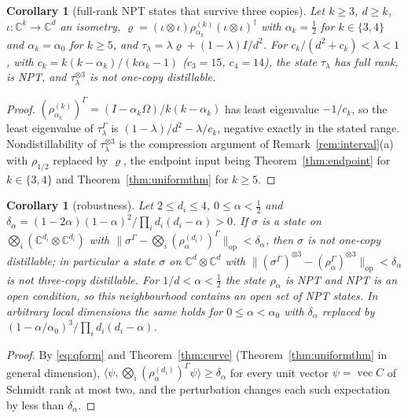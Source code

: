 \documentclass[aps,pra,twocolumn,superscriptaddress,nofootinbib,longbibliography]{revtex4-2}
\newcommand{\C}{\mathbb C}
\newcommand{\Om}{\Omega}
\DeclareMathOperator{\vecop}{vec}
\theoremstyle{plain}
\newtheorem{corollary}[theorem]{Corollary}
\theoremstyle{definition}
\theoremstyle{remark}
\begin{document}
\begin{corollary}[full-rank NPT states that survive three copies]\label{cor:noise}
Let $k\ge3$, $d\ge k$, $\iota:\C^k\to\C^d$ an isometry, $\varrho=(\iota\otimes\iota)\rho^{(k)}_{\alpha_k}(\iota\otimes\iota)^\dagger$ with $\alpha_k=\tfrac12$ for $k\in\{3,4\}$ and $\alpha_k=\alpha_0$ for $k\ge5$, and $\tau_\lambda=\lambda\varrho+(1-\lambda)I/d^2$. For $c_k/(d^2+c_k)<\lambda<1$, with $c_k=k(k-\alpha_k)/(k\alpha_k-1)$ ($c_3=15$, $c_4=14$), the state $\tau_\lambda$ has full rank, is NPT, and $\tau_\lambda^{\otimes3}$ is not one-copy distillable.
\end{corollary}
\begin{proof}
$(\rho^{(k)}_{\alpha_k})^\Gamma=(I-\alpha_k\Om)/k(k-\alpha_k)$ has least eigenvalue $-1/c_k$, so the least eigenvalue of $\tau_\lambda^\Gamma$ is $(1-\lambda)/d^2-\lambda/c_k$, negative exactly in the stated range. Nondistillability of $\tau_\lambda^{\otimes3}$ is the compression argument of Remark~\ref{rem:interval}(a) with $\rho_{1/2}$ replaced by $\varrho$, the endpoint input being Theorem~\ref{thm:endpoint} for $k\in\{3,4\}$ and Theorem~\ref{thm:uniformthm} for $k\ge5$.
\end{proof}

\begin{corollary}[robustness]\label{cor:robust}
Let $2\le d_i\le4$, $0\le\alpha<\tfrac12$ and $\delta_\alpha=(1-2\alpha)(1-\alpha)^2/\prod_id_i(d_i-\alpha)>0$. If $\sigma$ is a state on $\bigotimes_i(\C^{d_i}\otimes\C^{d_i})$ with $\|\sigma^\Gamma-\bigotimes_i(\rho^{(d_i)}_\alpha)^\Gamma\|_{\mathrm{op}}<\delta_\alpha$, then $\sigma$ is not one-copy distillable; in particular a state $\sigma$ on $\C^d\otimes\C^d$ with $\|(\sigma^\Gamma)^{\otimes3}-(\rho_\alpha^\Gamma)^{\otimes3}\|_{\mathrm{op}}<\delta_\alpha$ is not three-copy distillable. For $1/d<\alpha<\tfrac12$ the state $\rho_\alpha$ is NPT and NPT is an open condition, so this neighbourhood contains an open set of NPT states. In arbitrary local dimensions the same holds for $0\le\alpha<\alpha_0$ with $\delta_\alpha$ replaced by $(1-\alpha/\alpha_0)^3/\prod_id_i(d_i-\alpha)$.
\end{corollary}
\begin{proof}
By \eqref{eq:qform} and Theorem~\ref{thm:curve} (Theorem~\ref{thm:uniformthm} in general dimension), $\langle\psi,\bigotimes_i(\rho^{(d_i)}_\alpha)^\Gamma\psi\rangle\ge\delta_\alpha$ for every unit vector $\psi=\vecop C$ of Schmidt rank at most two, and the perturbation changes each such expectation by less than $\delta_\alpha$.
\end{proof}
\end{document}
